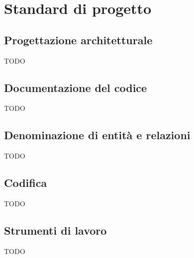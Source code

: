 %


\section{Standard di progetto} %
\label{sec:standard_di_progetto}
	\subsection{Progettazione architetturale} %
	\label{sub:progettazione_architetturale}
	TODO


	\subsection{Documentazione del codice} %
	\label{sub:documentazione_del_codice}
	TODO


	\subsection{Denominazione di entità e relazioni} %
	\label{sub:denominazione_di_entita_e_relazioni}
	TODO


	\subsection{Codifica} %
	\label{sub:codifica}
	TODO

	\subsection{Strumenti di lavoro} %
	\label{sub:strumenti_di_lavoro}
	TODO

